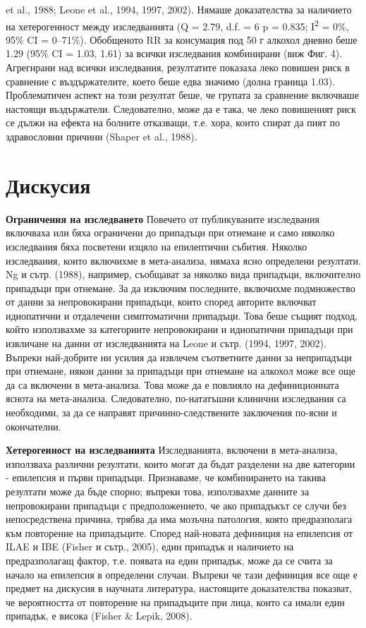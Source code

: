 \documentclass{article}
\begin{document}
et al., 1988; Leone et al., 1994, 1997, 2002). Нямаше
доказателства за наличието на хетерогенност между
изследванията (Q = 2.79, d.f. = 6 p = 0.835; I\textsuperscript{2} = 0\%, 95\% CI =
0–71\%). Обобщеното RR за консумация под 50 г
алкохол дневно беше 1.29 (95\% CI = 1.03, 1.61) за всички
изследвания комбинирани (виж Фиг. 4).
Агрегирани над всички изследвания, резултатите показаха
леко повишен риск в сравнение с въздържателите, което
беше едва значимо (долна граница 1.03). 
Проблематичен
аспект на този резултат беше, че групата за сравнение включваше настоящи въздържатели. Следователно, може да е така,
че леко повишеният риск се дължи на ефекта на болните отказващи,
т.е. хора, които спират да пият по здравословни причини (Shaper et al., 1988).

\section{Дискусия}

\textbf{Ограничения на изследването}
Повечето от публикуваните изследвания включваха или бяха ограничени до припадъци при отнемане и само няколко изследвания бяха посветени изцяло на епилептични събития. Няколко изследвания, които включихме в мета-анализа, нямаха ясно определени резултати. Ng и сътр. (1988), например, съобщават за няколко вида припадъци, включително припадъци при отнемане. За да изключим последните, включихме подмножество от данни за непровокирани припадъци, които според авторите включват идиопатични и отдалечени симптоматични припадъци. Това беше същият подход, който използвахме за категориите непровокирани и идиопатични припадъци при извличане на данни от изследванията на Leone и сътр. (1994, 1997, 2002). Въпреки най-добрите ни усилия да извлечем съответните данни за неприпадъци при отнемане, някои данни за припадъци при отнемане на алкохол може все още да са включени в мета-анализа. Това може да е повлияло на дефиниционната яснота на мета-анализа. Следователно, по-нататъшни клинични изследвания са необходими, за да се направят причинно-следствените заключения по-ясни и окончателни.

\textbf{Хетерогенност на изследванията}
Изследванията, включени в мета-анализа, използваха различни резултати, които могат да бъдат разделени на две категории - епилепсия и първи припадъци. Признаваме, че комбинирането на такива резултати може да бъде спорно; въпреки това, използвахме данните за непровокирани припадъци с предположението, че ако припадъкът се случи без непосредствена причина, трябва да има мозъчна патология, която предразполага към повторение на припадъците. Според най-новата дефиниция на епилепсия от ILAE и IBE (Fisher и сътр., 2005), един припадък и наличието на предразполагащ фактор, т.е. появата на един припадък, може да се счита за начало на епилепсия в определени случаи. Въпреки че тази дефиниция все още е предмет на дискусия в научната литература, настоящите доказателства показват, че вероятността от повторение на припадъците при лица, които са имали един припадък, е висока (Fisher \& Lepik, 2008).
\end{document}
